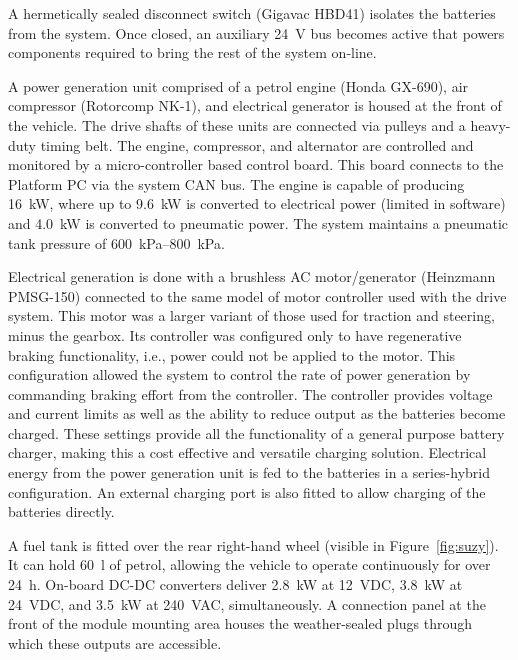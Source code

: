 \documentclass[preprint,authoryear,12pt]{elsarticle}
\begin{document}
        A hermetically sealed disconnect switch (Gigavac HBD41) isolates the batteries from the system.
        Once closed, an auxiliary \SI{24}{\volt} bus becomes active that powers components required to bring the rest of the system on-line.

        A power generation unit comprised of a petrol engine (Honda GX-690), air compressor (Rotorcomp NK-1), and electrical generator is housed at the front of the vehicle.
        The drive shafts of these units are connected via pulleys and a heavy-duty timing belt.
        The engine, compressor, and alternator are controlled and monitored by a micro-controller based control board.
        This board connects to the Platform PC via the system CAN bus.
        The engine is capable of producing \SI{16}{\kilo\watt}, where up to \SI{9.6}{\kilo\watt} is converted to electrical power (limited in software) and \SI{4.0}{\kilo\watt} is converted to pneumatic power.
        The system maintains a pneumatic tank pressure of \SIrange{600}{800}{\kilo\pascal}.

        Electrical generation is done with a brushless AC motor/generator (Heinzmann PMSG-150) connected to the same model of motor controller used with the drive system.
        This motor was a larger variant of those used for traction and steering, minus the gearbox.
        Its controller was configured only to have regenerative braking functionality, i.e., power could not be applied to the motor.
        This configuration allowed the system to control the rate of power generation by commanding braking effort from the controller.
        The controller provides voltage and current limits as well as the ability to reduce output as the batteries become charged.
        These settings provide all the functionality of a general purpose battery charger, making this a cost effective and versatile charging solution.
        Electrical energy from the power generation unit is fed to the batteries in a series-hybrid configuration.
        An external charging port is also fitted to allow charging of the batteries directly.

        A fuel tank is fitted over the rear right-hand wheel (visible in Figure~\ref{fig:suzy}).
        It can hold \SI{60}{\litre} of petrol, allowing the vehicle to operate continuously for over \SI{24}{\hour}.
        On-board DC-DC converters deliver \SI{2.8}{\kilo\watt} at \SI{12}{\volt}DC, \SI{3.8}{\kilo\watt} at \SI{24}{\volt}DC, and \SI{3.5}{\kilo\watt} at \SI{240}{\volt}AC, simultaneously.
        A connection panel at the front of the module mounting area houses the weather-sealed plugs through which these outputs are accessible.
\end{document}
